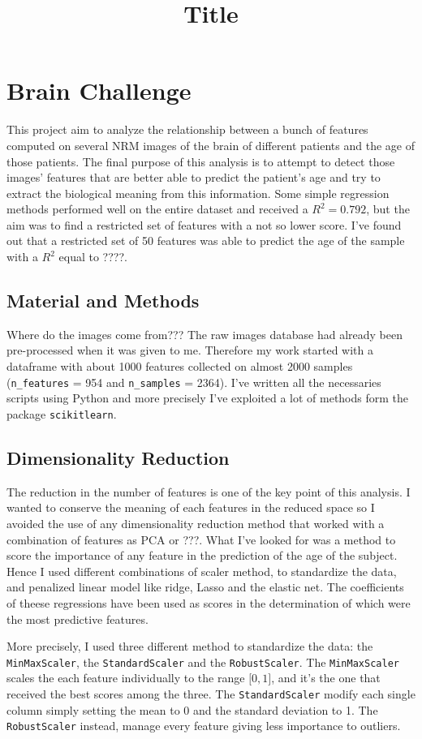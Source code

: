 \documentclass[11pt,a4paper]{report}
\begin{document}
\title{Title}

\section*{Brain Challenge}
This project aim to analyze the relationship between a bunch of features computed on several NRM images of the brain of different patients and the age of those patients. The final purpose of this analysis is to attempt to detect those images' features that are better able to predict the patient's age and try to extract the biological meaning from this information. Some simple regression methods performed well on the entire dataset and received a $R^{2} = 0.792$, but the aim was to find a restricted set of features with a not so lower score. I've found out that a restricted set of 50 features was able to predict the age of the sample with a $R^{2}$ equal to ????.



\subsection*{Material and Methods}
Where do the images come from???
The raw images database had already been pre-processed when it was given to me. Therefore my work started with a dataframe with about 1000 features collected on almost 2000 samples (\texttt{n\_features} = 954 and \texttt{n\_samples} = 2364). I've written all the necessaries scripts using Python and more precisely I've exploited a lot of methods form the package \texttt{scikitlearn}.

\subsection*{Dimensionality Reduction}
The reduction in the number of features is one of the key point of this analysis. I wanted to conserve the meaning of each features in the reduced space so I avoided the use of any dimensionality reduction method that worked with a combination of features as PCA or ???. What I've looked for was a method to score the importance of any feature in the prediction of the age of the subject. Hence I used different combinations of scaler method, to standardize the data, and penalized linear model like ridge, Lasso and the elastic net. The coefficients of theese regressions have been used as scores in the determination of which were the most predictive features.

More precisely, I used three different method to standardize the data: the \texttt{MinMaxScaler}, the \texttt{StandardScaler} and the \texttt{RobustScaler}. The \texttt{MinMaxScaler} scales the each feature individually to the range $\lbrack 0,1 \rbrack$, and it's the one that received the best scores among the three. The \texttt{StandardScaler} modify each single column simply setting the mean to 0 and the standard deviation to 1. The \texttt{RobustScaler} instead, manage every feature giving less importance to outliers.
\end{document}
